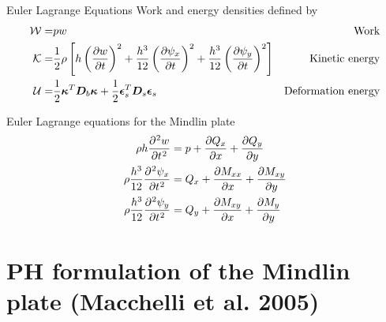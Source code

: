 \documentclass{beamer}
\begin{document}
\begin{frame}{Euler Lagrange Equations}
Work and energy densities defined by
\begin{align*}
\mathcal{W} =& pw &\text{Work}\\
\mathcal{K} =& \frac{1}{2} \rho \left[ h \left(\diffp{w}{t}\right)^2 +  \frac{h^3}{12}\left(\diffp{\psi_x}{t}\right)^2 + \frac{h^3}{12}\left(\diffp{\psi_y}{t}\right)^2 \right] &\text{Kinetic energy}\\
\mathcal{U} =& \frac{1}{2}\bm{\kappa}^T \bm{D}_b \bm{\kappa} + \frac{1}{2}\bm{\epsilon}_s^T \bm{D}_s \bm{\epsilon}_s  &\text{Deformation energy}	
\end{align*} 

\begin{block}{Euler Lagrange equations for the Mindlin plate}
	\begin{equation*}
	\begin{aligned}
	\rho h \diffp[2]{w}{t} &= p + \diffp{Q_x}{x} + \diffp{Q_y}{y} \\
	\rho\frac{h^3}{12} \diffp[2]{\psi_x}{t} &= Q_x + \diffp{M_{xx}}{x} + \diffp{M_{xy}}{y} \\
	\rho\frac{h^3}{12} \diffp[2]{\psi_y}{t} &= Q_y + \diffp{M_{xy}}{x} + \diffp{M_{y}}{y} \\
	\end{aligned}
	\end{equation*}
\end{block}

\end{frame}

\section{PH formulation of the Mindlin plate (Macchelli et al. 2005)}
\end{document}
